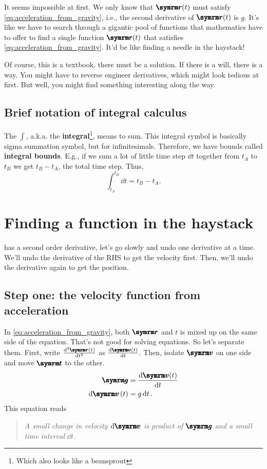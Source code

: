 It seems impossible at first. We only know that $\vv{r}(t)$ must satisfy \cref{eq:acceleration_from_gravity}, i.e., the second derivative of $\vv{r}(t)$ is $g$. It's like we have to search through a gigantic pool of functions that mathematics have to offer to find a single function $\vv{r}(t)$ that satisfies \cref{eq:acceleration_from_gravity}. It'd be like finding a needle in the haystack!

Of course, this is a textbook, there must be a solution. If there is a will, there is a way. You might have to reverse engineer derivatives, which might look tedious at first. But well, you might find something interesting along the way.

\subsection{Brief notation of integral calculus}
\label{sec:brief_notation_of_calculus_integral}

The $\displaystyle\int$, a.k.a. the \textbf{integral}\footnote{Which also looks like a beansprout}, means to sum. This integral symbol is basically sigma summation symbol, but for infinitesimals. Therefore, we have bounds called \textbf{integral bounds}. E.g., if we sum a lot of little time step $\dd{t}$ together from $t_A$ to $t_B$ we get $t_B - t_A$, the total time step. Thus,
\begin{equation}
    \int_{t_A}^{t_B}\dd{t} = t_B - t_A.
\end{equation}

\section{Finding a function in the haystack}
\label{sec:function_in_the_haystack}

 has a second order derivative, let's go slowly and undo one derivative at a time. We'll undo the derivative of the RHS to get the velocity first. Then, we'll undo the derivative again to get the position.

\subsection{Step one: the velocity function from acceleration}

In \cref{eq:acceleration_from_gravity}, both $\vv{r}$ and $t$ is mixed up on the same side of the equation. That's not good for solving equations. So let's separate them. First, write $\dv[2]{\vv{r}(t)}{t}$ as $\dv{\vv{v}(t)}{t}$. Then, isolate $\vv{v}$ on one side and move $\vv{t}$ to the other.
\begin{align}
    \vv{g} &= \dv{\vv{v}(t)}{t} \\
    \dd{\vv{v}}(t) &= g\dd{t}.
\end{align}
This equation reads
\begin{quotation}
    \emph{A small change in velocity $\dd{\vv{v}}$ is product of $\vv{g}$ and a small time interval $\dd{t}$.}
\end{quotation}

